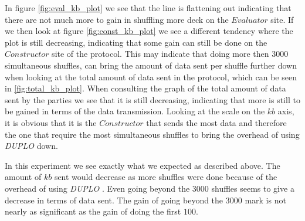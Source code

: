 \documentclass[twoside,11pt,openright]{report}
\newcommand{\DUPLO}{\textit{DUPLO} }
\begin{document}
In figure \ref{fig:eval_kb_plot} we see that the line is flattening out indicating that there are not much more to gain in shuffling more deck on the $Evaluator$ site. If we then look at figure \ref{fig:const_kb_plot} we see a different tendency where the plot is still decreasing, indicating that some gain can still be done on the $Constructor$ site of the protocol. This may indicate that doing more then $3000$ simultaneous shuffles, can bring the amount of data sent per shuffle further down when looking at the total amount of data sent in the protocol, which can be seen in \ref{fig:total_kb_plot}. When consulting the graph of the total amount of data sent by the parties we see that it is still decreasing, indicating that more is still to be gained in terms of the data transmission. Looking at the scale on the $kb$ axis, it is obvious that it is the $Constructor$ that sends the most data and therefore the one that require the most simultaneous shuffles to bring the overhead of using \DUPLO down.

\bigskip

In this experiment we see exactly what we expected as described above. The amount of $kb$ sent would decrease as more shuffles were done because of the overhead of using \DUPLO. Even going beyond the $3000$ shuffles seems to give a decrease in terms of data sent. The gain of going beyond the $3000$ mark is not nearly as significant as the gain of doing the first $100$.

\bigskip
\end{document}
